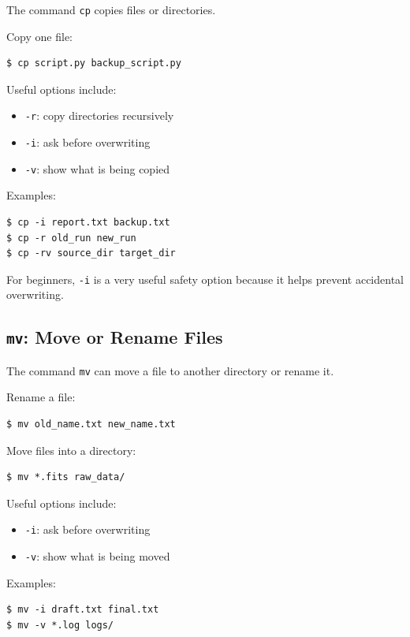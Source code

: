 The command \texttt{cp} copies files or directories.

Copy one file:

\begin{lstlisting}
$ cp script.py backup_script.py
\end{lstlisting}

Useful options include:

\begin{itemize}
\item \texttt{-r}: copy directories recursively
\item \texttt{-i}: ask before overwriting
\item \texttt{-v}: show what is being copied
\end{itemize}

Examples:

\begin{lstlisting}
$ cp -i report.txt backup.txt
$ cp -r old_run new_run
$ cp -rv source_dir target_dir
\end{lstlisting}

For beginners, \texttt{-i} is a very useful safety option because it
helps prevent accidental overwriting.

\subsection{\texttt{mv}: Move or Rename Files}

The command \texttt{mv} can move a file to another directory or rename it.

Rename a file:

\begin{lstlisting}
$ mv old_name.txt new_name.txt
\end{lstlisting}

Move files into a directory:

\begin{lstlisting}
$ mv *.fits raw_data/
\end{lstlisting}

Useful options include:

\begin{itemize}
\item \texttt{-i}: ask before overwriting
\item \texttt{-v}: show what is being moved
\end{itemize}

Examples:

\begin{lstlisting}
$ mv -i draft.txt final.txt
$ mv -v *.log logs/
\end{lstlisting}

